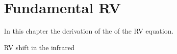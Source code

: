 
\chapter{Fundamental RV}
\label{cha:concepts}

In this chapter the derivation of the of the RV equation. 





RV shift in the infrared




